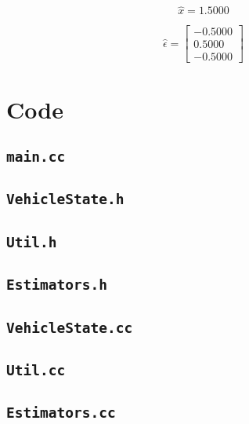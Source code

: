 \documentclass[11pt]{article}
\begin{document}
\begin{equation}
	\label{eq:estprob2}
	\hat{x} = 1.5000
\end{equation}

\begin{equation}
	\label{eq:errestprob2}
	\hat{\epsilon} = \begin{bmatrix}
		-0.5000 \\
		0.5000 \\
		-0.5000
	\end{bmatrix}
\end{equation}
\newpage
\appendix
\section{Code}

\subsection{\texttt{main.cc}}


\subsection{\texttt{VehicleState.h}}


\subsection{\texttt{Util.h}}


\subsection{\texttt{Estimators.h}}


\subsection{\texttt{VehicleState.cc}}


\subsection{\texttt{Util.cc}}


\subsection{\texttt{Estimators.cc}}


%
%
\end{document}
